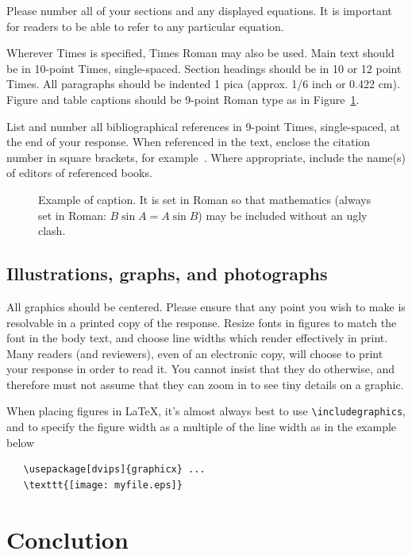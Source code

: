 \documentclass[final]{cvpr}
\begin{document}
Please number all of your sections and any displayed equations.  It is important
for readers to be able to refer to any particular equation.

Wherever Times is specified, Times Roman may also be used.  Main text should be
in 10-point Times, single-spaced. Section headings should be in 10 or 12 point
Times.  All paragraphs should be indented 1 pica (approx. 1/6 inch or 0.422
cm).  Figure and table captions should be 9-point Roman type as in
Figure~\ref{fig:onecol}.


List and number all bibliographical references in 9-point Times, single-spaced,
at the end of your response. When referenced in the text, enclose the citation
number in square brackets, for example~\cite{Authors14}.  Where appropriate,
include the name(s) of editors of referenced books.

\begin{figure}[t]
\begin{center}
\fbox{\rule{0pt}{1in} \rule{0.9\linewidth}{0pt}}
\end{center}
   \caption{Example of caption.  It is set in Roman so that mathematics
   (always set in Roman: $B \sin A = A \sin B$) may be included without an
   ugly clash.}
\label{fig:long}
\label{fig:onecol}
\end{figure}


\subsection{Illustrations, graphs, and photographs}

All graphics should be centered.  Please ensure that any point you wish to make is resolvable in a printed copy of the response.  Resize fonts in figures to match the font in the body text, and choose line widths which render effectively in print.  Many readers (and reviewers), even of an electronic copy, will choose to print your response in order to read it.  You cannot insist that they do otherwise, and therefore must not assume that they can zoom in to see tiny details on a graphic.

When placing figures in \LaTeX, it's almost always best to use \verb+\includegraphics+, and to specify the  figure width as a multiple of the line width as in the example below



{\small\begin{verbatim}
   \usepackage[dvips]{graphicx} ...
   \texttt{[image: myfile.eps]}
\end{verbatim}
}

\section{Conclution}

{\small


}
\end{document}
